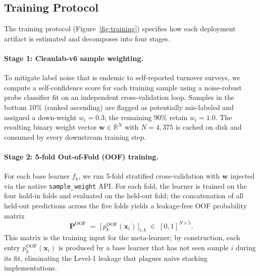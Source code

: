 \documentclass[11pt,a4paper]{article}
\newcommand{\Pof}{\mathbf{P}^{\mathrm{OOF}}}
\newcommand{\RR}{\mathbb{R}}
\begin{document}
\subsection{Training Protocol}
\label{sec:methods-training}

The training protocol (Figure~\ref{fig:training}) specifies how each
deployment artifact is estimated and decomposes into four stages.

\paragraph{Stage 1: Cleanlab-v6 sample weighting.}
To mitigate label noise that is endemic to self-reported turnover
surveys, we compute a self-confidence score for each training sample
using a noise-robust probe classifier fit on an independent
cross-validation loop. Samples in the bottom 10\% (ranked ascending) are
flagged as potentially mis-labeled and assigned a down-weight
$w_i = 0.3$; the remaining 90\% retain $w_i = 1.0$. The resulting binary
weight vector $\mathbf{w}\in\RR^{N}$ with $N=4{,}375$ is cached on disk
and consumed by every downstream training step.

\paragraph{Stage 2: 5-fold Out-of-Fold (OOF) training.}
For each base learner $f_k$, we run 5-fold stratified cross-validation
with $\mathbf{w}$ injected via the native \texttt{sample\_weight} API.
For each fold, the learner is trained on the four hold-in folds and
evaluated on the held-out fold; the concatenation of all held-out
predictions across the five folds yields a leakage-free OOF probability
matrix
\[
\Pof \;=\; \bigl[\,p_k^{\mathrm{OOF}}(\mathbf{x}_i)\,\bigr]_{i,k}
\;\in\; [0,1]^{N\times 5}.
\]
This matrix is the training input for the meta-learner; by construction,
each entry $p_k^{\mathrm{OOF}}(\mathbf{x}_i)$ is produced by a base
learner that has not seen sample $i$ during its fit, eliminating the
Level-1 leakage that plagues naive stacking implementations.
\end{document}
